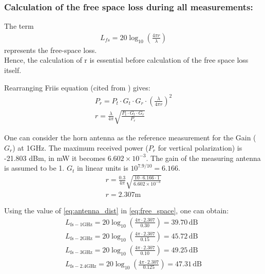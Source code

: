 \subsubsection{\textbf{Calculation of the free space loss during all measurements:}}

The term
\begin{gather}
	L_{fs} = \mathrm{20}\log_{10}\left(\frac{4\pi r}{\lambda}\right)	\label{eq:free_space}
\end{gather}
represents the free-space loss. \\Hence, the calculation of r is essential before calculation of the free space loss itself.

Rearranging Friis equation (cited from \cite{friis-script}) gives:
\begin{gather}
	P_r = P_t \cdot G_t \cdot G_r \cdot \left(\frac{\lambda}{4\pi r}\right)^2 \nonumber \\
	r = \frac{\lambda}{4\pi}\sqrt{\frac{P_t \cdot G_t \cdot G_r}{P_r}} \label{eq:friis_r}
\end{gather}

One can consider the horn antenna as the reference measurement for the Gain ($G_r$) at 1GHz. The maximum received power ($P_r$ for vertical polarization) is -21.803 dBm, in mW it becomes $6.602 \times 10^{-3}$. The gain of the measuring antenna is assumed to be 1. $G_t$ in linear units is $10^{7.9/10} = 6.166$.
\begin{gather}
	r = \frac{0.3}{4\pi}\sqrt{\frac{10 \cdot 6.166 \cdot 1}{6.602\times10^{-3}}} \nonumber \\
	\boxed{r = 2.307\mathrm{m}} \label{eq:antenna_dist}
\end{gather}

Using the value of \ref{eq:antenna_dist} in \ref{eq:free_space}, one can obtain:
\begin{gather}
	L_{\mathrm{fs-1GHz}} = \mathrm{20}\log_{10}\left(\frac{4\pi \cdot2.307}{0.30}\right) =  39.70\,\mathrm{dB} \nonumber \\
	L_{\mathrm{fs-2GHz}} = \mathrm{20}\log_{10}\left(\frac{4\pi \cdot2.307}{0.15}\right) = 45.72\,\mathrm{dB} \nonumber \\
	L_{\mathrm{fs-3GHz}} = \mathrm{20}\log_{10}\left(\frac{4\pi \cdot2.307}{0.10}\right) = 49.25\,\mathrm{dB} \nonumber \\
	L_{\mathrm{fs-2.4GHz}} = \mathrm{20}\log_{10}\left(\frac{4\pi \cdot2.307}{0.125}\right) = 47.31\,\mathrm{dB} \nonumber
\end{gather}

